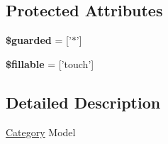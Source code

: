 \subsection*{Protected Attributes}
\begin{DoxyCompactItemize}
\item 
\hypertarget{classDMA_1_1Friends_1_1Models_1_1Category_aa3d19857f5a9bdf8be035d38d81a674b}{{\bfseries \$guarded} = \mbox{[}'$\ast$'\mbox{]}}\label{classDMA_1_1Friends_1_1Models_1_1Category_aa3d19857f5a9bdf8be035d38d81a674b}

\item 
\hypertarget{classDMA_1_1Friends_1_1Models_1_1Category_a2394991fde438a2f76dc8795d6ad8f5a}{{\bfseries \$fillable} = \mbox{[}'touch'\mbox{]}}\label{classDMA_1_1Friends_1_1Models_1_1Category_a2394991fde438a2f76dc8795d6ad8f5a}

\end{DoxyCompactItemize}


\subsection{Detailed Description}
\hyperlink{classDMA_1_1Friends_1_1Models_1_1Category}{Category} Model 

